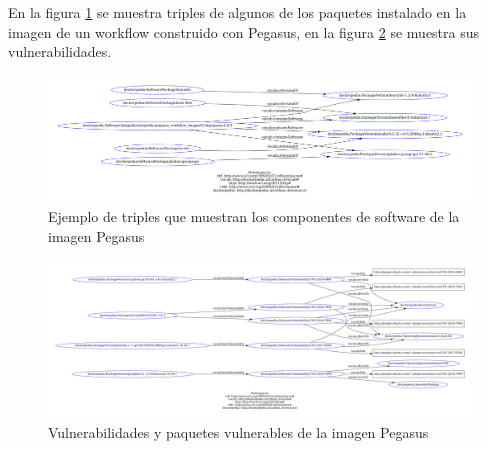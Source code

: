 En la figura  \ref{fig:packages-pegasus} se muestra triples de algunos de los paquetes instalado en la imagen de un workflow construido con Pegasus, en la figura \ref{fig:vulnerability-pegasus} se muestra sus vulnerabilidades.
\begin{figure}[t]
    \hspace*{-4cm}   
    \includegraphics[width=1.3\textwidth]{Figures/packages}
     \caption[Paquetes de la imagen Pegasus]{Ejemplo de triples que muestran los componentes de software de la imagen Pegasus}
    \label{fig:packages-pegasus}
      
\end{figure}

\begin{figure}[t]
    \hspace*{-4cm}   
    \includegraphics[width=1.3\textwidth]{Figures/packages-vuln}
      \caption[Paquetes y vulnerabilidades de la imagen Pegasus]{Vulnerabilidades y paquetes vulnerables de la imagen Pegasus}
    \label{fig:vulnerability-pegasus}
\end{figure}
